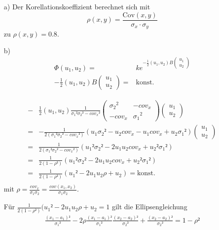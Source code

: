 \begin{itemize}
\item[a)] Der Korellationskoeffizient berechnet sich mit
\begin{equation}
\rho(x,y)=\frac{\text{Cov}(x,y)}{\sigma_x\cdot\sigma_y}
\end{equation}
zu $\rho(x,y)=0.8.$

\item[b)] 
\begin{align*}
\Phi(u_1,u_2) =& ke^{-\frac{1}{2}(u_1,u_2)B
\begin{pmatrix}
 u_1\\
 u_2
\end{pmatrix}
}\\
-\frac{1}{2}(u_1,u_2)B
\begin{pmatrix}
 u_1\\
 u_2
\end{pmatrix}
= &\text{konst.}
\end{align*}

\begin{align*}
-&\frac{1}{2}(u_1,u_2)
\frac{1}{{\sigma_1}²{\sigma_2}²-{cov_x}²}
\begin{pmatrix}
{\sigma_2}^2 & -cov_x\\
-cov_x &{\sigma_1}^2 
\end{pmatrix}
\begin{pmatrix}
 u_1\\
 u_2
\end{pmatrix}
\\=&-\frac{1}{2({\sigma_1}²{\sigma_2}²-{cov_x}²)}
(u_1{\sigma_2}²-u_2cov_x-u_1cov_x+u_2{\sigma_1}²)
\begin{pmatrix}
 u_1\\
 u_2
\end{pmatrix}\\
=&\frac{1}{2({\sigma_1}²{\sigma_2}²-{cov_x}²)}
({u_1}²{\sigma_2}²-2u_1u_2cov_x+{u_2}²{\sigma_1}²)\\
=&\frac{1}{2(1-\rho²)}
({u_1}²{\sigma_2}²-2u_1u_2cov_x+{u_2}²{\sigma_1}²)\\
=&\frac{1}{2(1-\rho²)}
({u_1}²-2u_1u_2\rho+{u_2})=\text{konst.}\\
\end{align*}
mit $\rho=\frac{cov_x}{\sigma_1\sigma_2}=\frac{cov(x_1,x_2)}{\sigma_1\sigma_2}.$

Für $\frac{1}{2(1-\rho²)}({u_1}²-2u_1u_2\rho+{u_2}=1$ gilt die Ellipsengleichung
\begin{align*}
\frac{(x_1-a_1)²}{{\sigma_1}²}-2\rho\frac{(x_1-a_1)²}{{\sigma_1}²}\frac{(x_2-a_2)²}{{\sigma_2}²}+\frac{(x_2-a_2)²}{{\sigma_2}²}= 1-\rho²
\end{align*}


\end{itemize}
